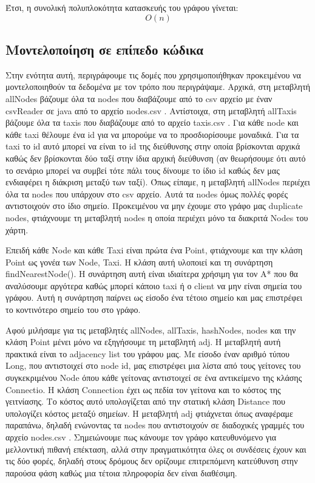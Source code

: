 \documentclass[a4paper,oneside, 11pt]{article}
\begin{document}
Έτσι, η συνολική πολυπλοκότητα κατασκευής του γράφου γίνεται:
$$O(n)$$

\subsection{Μοντελοποίηση σε επίπεδο κώδικα}

Στην ενότητα αυτή, περιγράφουμε τις δομές που χρησιμοποιήθηκαν προκειμένου να μοντελοποιηθούν τα δεδομένα με τον τρόπο που περιγράψαμε. Αρχικά, στη μεταβλητή allNodes βάζουμε όλα τα nodes που διαβάζουμε από το csv αρχείο με έναν csvReader σε java από το αρχείο nodes.csv . Αντίστοιχα, στη μεταβλητή allTaxis βάζουμε όλα τα taxis που διαβάζουμε από το αρχείο taxis.csv . Για κάθε node και κάθε taxi θέλουμε ένα id για να μπορούμε να το προσδιορίσουμε μοναδικά. Για τα taxi το id αυτό μπορεί να είναι το id της διεύθυνσης στην οποία βρίσκονται αρχικά καθώς δεν βρίσκονται δύο ταξί στην ίδια αρχική διεύθυνση (αν θεωρήσουμε ότι αυτό το σενάριο μπορεί να συμβεί τότε πάλι τους δίνουμε το ίδιο id καθώς δεν μας ενδιαφέρει η διάκριση μεταξύ των ταξί). Όπως είπαμε, η μεταβλητή allNodes περιέχει όλα τα nodes που υπάρχουν στο csv αρχείο. Αυτά τα nodes όμως πολλές φορές αντιστοιχούν στο ίδιο σημείο. Προκειμένου να μην έχουμε στο γράφο μας duplicate nodes, φτιάχνουμε τη μεταβλητή nodes η οποία περιέχει μόνο τα διακριτά Nodes του χάρτη. \bigbreak 


Επειδή κάθε Node και κάθε Taxi είναι πρώτα ένα Point, φτιάχνουμε και την κλάση Point ως γονέα των Node, Taxi. Η κλάση αυτή υλοποιεί και τη συνάρτηση findNearestNode(). Η συνάρτηση αυτή είναι ιδιαίτερα χρήσιμη για τον A* που θα αναλύσουμε αργότερα καθώς μπορεί κάποιο taxi ή ο client να μην είναι σημεία του γράφου. Αυτή η συνάρτηση παίρνει ως είσοδο ένα τέτοιο σημείο και μας επιστρέφει το κοντινότερο σημείο του στο γράφο. \bigbreak 

Αφού μιλήσαμε για τις μεταβλητές allNodes, allTaxis, hashNodes, nodes και την κλάση Point μένει μόνο να εξηγήσουμε τη μεταβλητή 
adj. Η μεταβλητή αυτή πρακτικά είναι το adjacency list του γράφου μας. Με είσοδο έναν αριθμό τύπου Long, που αντιστοιχεί στο node id, μας επιστρέφει μια λίστα από τους γείτονες του συγκεκριμένου Node όπου κάθε γείτονας αντιστοιχεί σε ένα αντικείμενο της κλάσης Connectio. H κλάση Connection έχει ως πεδία τον γείτονα και το κόστος της γειτνίασης. Το κόστος αυτό υπολογίζεται από την στατική κλάση Distance που υπολογίζει κόστος μεταξύ σημείων. Η μεταβλητή adj φτιάχνεται όπως αναφέραμε παραπάνω, δηλαδή ενώνοντας τα nodes που αντιστοιχούν σε διαδοχικές γραμμές του αρχείο nodes.csv . Σημειώνουμε πως κάνουμε τον γράφο κατευθυνόμενο για μελλοντική πιθανή επέκταση, αλλά στην πραγματικότητα όλες οι συνδέσεις έχουν και τις δύο φορές, δηλαδή στους δρόμους δεν ορίζουμε επιτρεπόμενη κατεύθυνση στην παρούσα φάση καθώς μια τέτοια πληροφορία δεν είναι διαθέσιμη.
\end{document}
